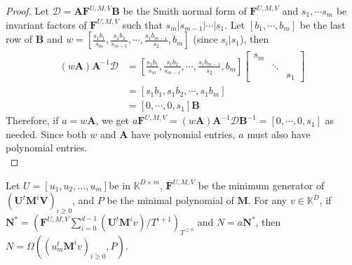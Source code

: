 \documentclass[12pt]{article}
\def\K {\ensuremath{\mathbb{K}}}
\def\K{\mathbb{K}}
\def\mA{\mathbf{A}}
\def\mB{\mathbf{B}}
\def\mF{\mathbf{F}}
\def\mM{\mathbf{M}}
\def\mN{\mathbf{N}}
\def\mU{\mathbf{U}}
\def\mV{\mathbf{V}}
\begin{document}
\begin{proof}
	Let $\mathscr{D} = \mA\mF^{U,M,V}\mB$ be the Smith normal form of $\mF^{U,M,V}$ and $s_1, \cdots s_m$ be
	invariant factors of $\mF^{U,M,V}$ such that 
	$s_m | s_{m-1} | \cdots | s_1$.
	Let $[b_1,\cdots,b_m]$ be the last row of $\mB$ and 
	$w = [\frac{s_1b_1}{s_m},\frac{s_1b_2}{s_{m-1}},\cdots,\frac{s_1b_{m-1}}{s_2},b_m]$ (since $s_i | s_1$), then
	\begin{align*}
	(w \mA) \mA^{-1} \mathscr{D} &=  [\frac{s_1b_1}{s_m},\frac{s_1b_2}{s_{m-1}},\cdots,\frac{s_1b_{m-1}}{s_2},b_m]
	\begin{bmatrix}
	s_m &        & \\
	& \ddots & \\
	&        & s_1
	\end{bmatrix}\\
	&= [s_1b_1, s_1b_2, \cdots, s_1b_m]\\
	&= [0,\cdots,0,s_1] \mB
	\end{align*}
	Therefore, if $a = w \mA$, we get
	$ a \mF^{U,M,V} = (w \mA) \mA^{-1} \mathscr{D} \mB^{-1} = 
	[0,\cdots,0,s_1]$ as needed. Since both $w$ and $\mA$ have polynomial
	entries, $a$ must also have polynomial entries.\\
\end{proof}

\begin{theorem}
	 Let $U = [u_1,u_2,\dots,u_m]$be in $\K^{D\times m}$,
	 $\mF^{U,M,V}$ be the minimum generator of $(\mU^t \mM^i \mV)_{i\ge0}$,
	 and $P$ be the minimal polynomial of $\mM$. For any 
	 $v \in \K^{D}$, if\\ 
	 $\mN^* = (\mF^{U,M,V}\sum_{i=0}^{d-1} (\mU^t \mM^i v)/T^{i+1})_{T^{\ge0}}$ 
	 and $N = a\mN^*$,
	 then $N = \Omega((u_m^t \mM^i v)_{i\ge0},P)$.
	 \label{theorem:anyv}
\end{theorem}
\end{document}
